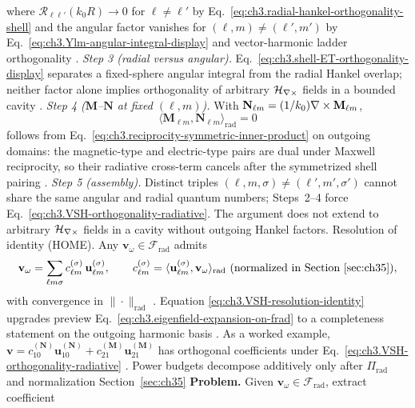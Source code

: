 where $\mathcal{R}_{\ell\ell'}(k_0 R)\to 0$ for $\ell\neq\ell'$ by
Eq.~\eqref{eq:ch3.radial-hankel-orthogonality-shell} and the angular factor vanishes for
$(\ell,m)\neq(\ell',m')$ by Eq.~\eqref{eq:ch3.Ylm-angular-integral-display} and vector-harmonic ladder orthogonality
\cite{jackson1999,hansen1988}.
\emph{Step 3 (radial versus angular).} Eq.~\eqref{eq:ch3.shell-ET-orthogonality-display} separates a fixed-sphere angular
integral from the radial Hankel overlap; neither factor alone implies orthogonality of arbitrary
$\mathcal{H}_{\nabla\times}$ fields in a bounded cavity \cite{hansen1988}.
\emph{Step 4 ($\mathbf{M}$--$\mathbf{N}$ at fixed $(\ell,m)$).}
With $\mathbf{N}_{\ell m}=(1/k_0)\nabla\times\mathbf{M}_{\ell m}$,
\begin{equation}
\label{eq:ch3.MN-cross-radiative-display}
\langle \mathbf{M}_{\ell m},\mathbf{N}_{\ell m}\rangle_{\mathrm{rad}}
=0
\end{equation}
follows from Eq.~\eqref{eq:ch3.reciprocity-symmetric-inner-product} on outgoing domains: the magnetic-type and electric-type
pairs are dual under Maxwell reciprocity, so their radiative cross-term cancels after the symmetrized shell pairing
\cite{stratton1941}.
\emph{Step 5 (assembly).} Distinct triples $(\ell,m,\sigma)\neq(\ell',m',\sigma')$ cannot share the same angular
and radial quantum numbers; Steps~2--4 force
Eq.~\eqref{eq:ch3.VSH-orthogonality-radiative}.
The argument does not extend to arbitrary $\mathcal{H}_{\nabla\times}$ fields in a cavity without outgoing Hankel factors.
Resolution of identity (HOME). Any \(\mathbf{v}_\omega\in\mathcal{F}_{\mathrm{rad}}\) admits
\begin{equation}
\label{eq:ch3.VSH-resolution-identity}
\mathbf{v}_\omega
=
\sum_{\ell m\sigma}
c_{\ell m}^{(\sigma)}\,\mathbf{u}_{\ell m}^{(\sigma)},
\qquad
c_{\ell m}^{(\sigma)}
=
\langle \mathbf{u}_{\ell m}^{(\sigma)},\mathbf{v}_\omega\rangle_{\mathrm{rad}}
\ \text{(normalized in Section~\ref{sec:ch35})},
\end{equation}
with convergence in \(\|\cdot\|_{\mathrm{rad}}\) . Equation
\eqref{eq:ch3.VSH-resolution-identity} upgrades preview Eq.~\eqref{eq:ch3.eigenfield-expansion-on-frad} to a
completeness statement on the outgoing harmonic basis .
As a worked example, \(\mathbf{v}=c_{10}^{(\mathbf{N})}\mathbf{u}_{10}^{(\mathbf{N})}+c_{21}^{(\mathbf{M})}\mathbf{u}_{21}^{(\mathbf{M})}\) has
orthogonal coefficients under Eq.~\eqref{eq:ch3.VSH-orthogonality-radiative} . Power
budgets decompose additively only after \(\Pi_{\mathrm{rad}}\) and normalization Section~\ref{sec:ch35}
\textbf{Problem.} Given \(\mathbf{v}_\omega\in\mathcal{F}_{\mathrm{rad}}\), extract coefficient
